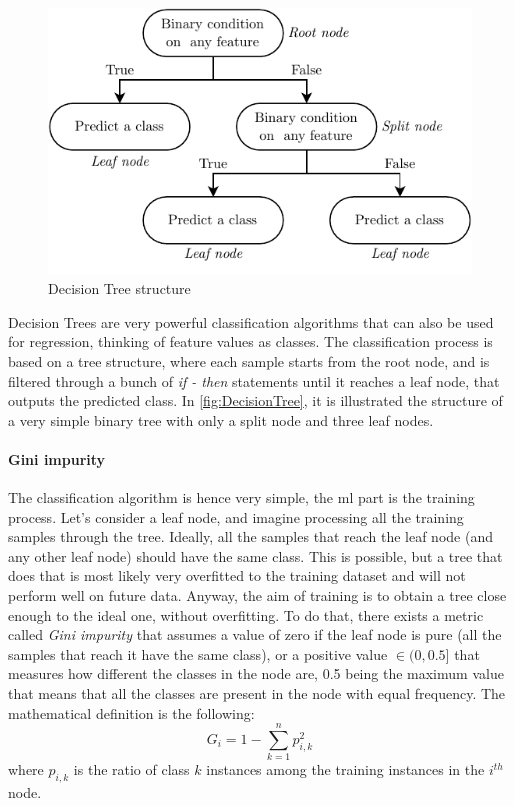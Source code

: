\begin{figure}
    \centering
    \includegraphics[scale = 1]{images/MachineLearning/DT_structure.pdf}
    \caption{Decision Tree structure}
    \label{fig:DecisionTree}
\end{figure}

Decision Trees are very powerful classification algorithms that can also be used for regression, thinking of feature values as classes. The classification process is based on a tree structure, where each sample starts from the root node, and is filtered through a bunch of \emph{if - then} statements until it reaches a leaf node, that outputs the predicted class. In \autoref{fig:DecisionTree}, it is illustrated the structure of a very simple binary tree with only a split node and three leaf nodes.

\paragraph*{Gini impurity}
The classification algorithm is hence very simple, the \gls{ml} part is the training process. Let's consider a leaf node, and imagine processing all the training samples through the tree. Ideally, all the samples that reach the leaf node (and any other leaf node) should have the same class. This is possible, but a tree that does that is most likely very overfitted to the training dataset and will not perform well on future data. Anyway, the aim of training is to obtain a tree close enough to the ideal one, without overfitting. To do that, there exists a metric called \emph{Gini impurity} that assumes a value of zero if the leaf node is pure (all the samples that reach it have the same class), or a positive value $\in (0,0.5]$ that measures how different the classes in the node are, 0.5 being the maximum value that means that all the classes are present in the node with equal frequency. The mathematical definition is the following:
\begin{equation}
    G_i = 1 - \sum_{k=1}^{n}p_{i,k}^2
\end{equation}
where $p_{i,k}$ is the ratio of class $k$ instances among the training instances in the $i^{th}$ node.

